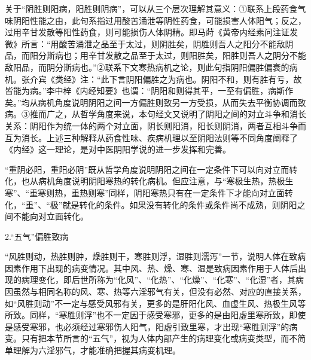\documentclass[12pt]{ctexbook}
\begin{document}
关于“阴胜则阳病，阳胜则阴病”，可以从三个层次理解其意义：①联系上段药食气味阴阳性能之由，此句系指过用酸苦涌泄等阴性药食，可能损害人体阳气；反之，过用辛甘发散等阳性药食，则可能损伤人体阴精。即马莳《黄帝内经素问注证发微》所言：“用酸苦涌泄之品至于太过，则阴胜矣，阴胜则吾人之阳分不能敌阴品，而阳分斯病也；用辛甘发散之品至于太过，则阳胜矣，阳胜则吾人之阴分不能敌阳品，而阴分斯病也。”②联系下文寒热病机之论，则此句指阴阳偏胜偏衰的病机。张介宾《类经》注：“此下言阴阳偏胜之为病也。阴阳不和，则有胜有亏，故皆能为病。”李中梓《内经知要》也谓：“阴阳和则得其平，一至有偏胜，病斯作矣。”均从病机角度说明阴阳之间一方偏胜则致另一方受损，从而失去平衡协调而致病。③推而广之，从哲学角度来说，本句经文又说明了阴阳之间的对立斗争和消长关系：阴阳作为统一体的两个对立面，阴长则阳消，阳长则阴消，两者互相斗争而互为消长。上述三种解释从药食性味、疾病机理以至阴阳法则等不同角度阐释了《内经》这一理论，是对中医阴阳学说的进一步发挥和完善。

“重阴必阳，重阳必阴”既从哲学角度说明阴阳之间在一定条件下可以向对立而转化，也从病机角度说明阴阳寒热的转化病机。但应注意，与“寒极生热，热极生寒”、“重寒则热，重热则寒”同样，阴阳寒热只有在一定条件下才能向对立面转化，“重”、“极”就是转化的条件。如果没有转化的条件或条件尚不成熟，则阴阳之间不能向对立面转化。

2.“五气”偏胜致病

“风胜则动，热胜则肿，燥胜则干，寒胜则浮，湿胜则濡泻”一节，说明人体在致病因素作用下出现的病变情况。其中风、热、燥、寒、湿是致病因素作用于人体后出现的病理变化，即后世所称为“化风”、“化热”、“化燥”、“化寒”、“化湿”者，其病因虽然与相同名称的风、寒、热等六淫邪气有关，但没有必然、对应的直接关系，如“风胜则动”不一定与感受风邪有关，更多的是肝阳化风、血虚生风、热极生风等所致。同样，“寒胜则浮”也不一定因于感受寒邪，更多的是由阳虚里寒所致，即使是感受寒邪，也必须经过寒邪伤人阳气，阳虚引致里寒，才出现“寒胜则浮”的病变。只有把本节所言的“五气”，视为人体内部产生的病理变化或病变类型，而不简单理解为六淫邪气，才能准确把握其病变机理。

\end{document}

